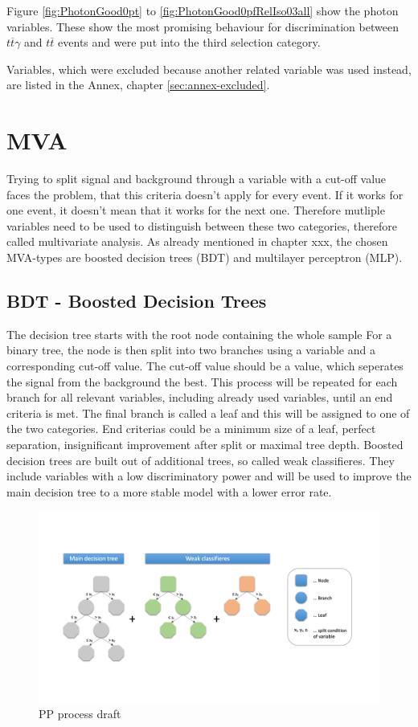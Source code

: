 \documentclass[11pt]{scrartcl}
\begin{document}
Figure \ref{fig:PhotonGood0pt} to \ref{fig:PhotonGood0pfRelIso03all} show the photon variables. These show the most promising behaviour for discrimination between $t\overline{t}\gamma$ and $t\overline{t}$ events and were put into the third selection category.

Variables, which were excluded because another related variable was used instead, are listed in the Annex, chapter \ref{sec:annex-excluded}. 

\section{MVA}

Trying to split signal and background through a variable with a cut-off value faces the problem, that this criteria doesn't apply for every event. If it works for one event, it doesn't mean that it works for the next one. Therefore mutliple variables need to be used to distinguish between these two categories, therefore called multivariate analysis. As already mentioned in chapter xxx, the chosen MVA-types are boosted decision trees (BDT) and multilayer perceptron (MLP).

	\subsection{BDT - Boosted Decision Trees}
	The decision tree starts with the root node containing the whole sample For a binary tree, the node is then split into two branches using a variable and a corresponding cut-off value. The cut-off value should be a value, which seperates the signal from the background the best. This process will be repeated for each branch for all relevant variables, including already used variables, until an end criteria is met. The final branch is called a leaf and this will be assigned to one of the two categories. End criterias could be a minimum size of a leaf, perfect separation, insignificant improvement after split or maximal tree depth. Boosted decision trees are built out of additional trees, so called weak classifieres. They include variables with a low discriminatory power and will be used to improve the main decision tree to a more stable model with a lower error rate. 

	\begin{figure}[H]
	\centering
	\includegraphics[width=1\textwidth]{figures/BDT.png}
	\caption{PP process draft}
	\end{figure}
	
\end{document}
